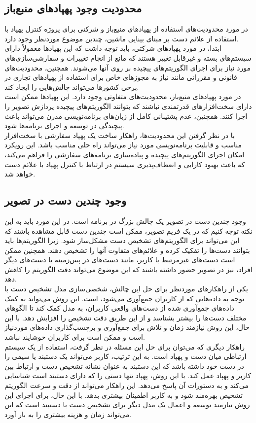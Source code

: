 \subsection{محدودیت وجود پهپاد‌های منبع‌باز}
در مورد محدودیت‌های استفاده از پهپادهای منبع‌باز و شرکتی برای پروژه کنترل پهپاد با استفاده از علائم دست بر مبنای بینایی ماشین، چندین موضوع موردنظر وجود دارد. 
\\
ابتدا، در مورد پهپادهای شرکتی، باید توجه داشت که این پهپادها معمولاً دارای سیستم‌های بسته و غیرقابل تغییر هستند که مانع از انجام تغییرات و سفارشی‌سازی‌های مورد نیاز برای اجرای الگوریتم‌های پیچیده بر روی آنها می‌شوند. همچنین، 
محدودیت‌های قانونی و مقرراتی مانند نیاز به مجوزهای خاص برای استفاده از پهپادهای تجاری در برخی کشورها می‌تواند چالش‌هایی را ایجاد کند.
\\
در مورد پهپادهای منبع‌باز، محدودیت‌های متفاوتی وجود دارد. این پهپادها ممکن است دارای سخت‌افزارهای قدرتمندی نباشند که بتوانند الگوریتم‌های پیچیده پردازش تصویر را اجرا کنند. همچنین، عدم پشتیبانی کامل از زبان‌های برنامه‌نویسی مدرن می‌تواند باعث پیچیدگی در توسعه و اجرای برنامه‌ها شود.
\\
با در نظر گرفتن این محدودیت‌ها، راهکار ساخت یک پهپاد سفارشی با سخت‌افزار مناسب و قابلیت برنامه‌نویسی مورد نیاز می‌تواند راه حلی مناسب باشد. این رویکرد امکان اجرای الگوریتم‌های پیچیده و پیاده‌سازی برنامه‌های سفارشی را فراهم می‌کند، که باعث بهبود کارایی و انعطاف‌پذیری سیستم در ارتباط با کنترل پهپاد با علائم دست خواهد شد.

\subsection{وجود چندین دست در تصویر}
وجود چندین دست در تصویر یک چالش بزرگ در برنامه است. در این مورد باید به این نکته توجه کنیم که در یک فریم تصویر، ممکن است چندین دست قابل مشاهده باشند که این می‌تواند برای الگوریتم‌های تشخیص دست مشکل‌ساز شود. زیرا 
الگوریتم‌ها باید بتوانند دست‌ها را تفکیک کرده و علائم‌های متفاوت آنها را تشخیص دهند. همچنین ممکن است دست‌های غیرمرتبط با کاربر، مانند دست‌های در پس‌زمینه یا دست‌های دیگر افراد، نیز در تصویر حضور داشته باشند که این موضوع می‌تواند دقت الگوریتم را کاهش دهد.
\\
یکی از راهکارهای موردنظر برای حل این چالش، شخصی‌سازی مدل تشخیص دست با توجه به داده‌هایی که از کاربران جمع‌آوری می‌شود، است. این روش می‌تواند به کمک داده‌های جمع‌آوری شده از دست‌های واقعی کاربران، به مدل کمک 
کند تا الگوهای مختلف دست‌ها را بیشتر بشناسد و از این طریق دقت تشخیص را افزایش دهد. با این حال، این روش نیازمند زمان و تلاش برای جمع‌آوری و برچسب‌گذاری داده‌های موردنیاز است و ممکن است برای کاربران خوشایند نباشد.
\\
راهکار دیگری که می‌توان برای حل این مسئله در نظر گرفت، استفاده از یک سیستم ارتباطی میان دست و پهپاد است. به این ترتیب، کاربر می‌تواند یک دستبند یا سیمی را در دست خود داشته باشد که این دستبند به عنوان نشانه تشخیص دست و 
ارتباط بین کاربر و پهپاد عمل کند. با این روش، پهپاد تنها دستی را که دارای دستبند است شناسایی می‌کند و به دستورات آن پاسخ می‌دهد. این راهکار می‌تواند از دقت و سرعت الگوریتم تشخیص بهره‌مند شود و به کاربر اطمینان بیشتری بدهد. با 
این حال، برای اجرای این روش نیازمند توسعه و اعمال یک مدل دیگر برای تشخیص دست با دستبند است که این می‌تواند زمان و هزینه بیشتری را به بار آورد.


